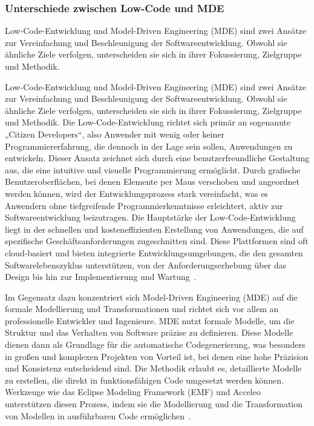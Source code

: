 \subsubsection{Unterschiede zwischen Low-Code und MDE}
Low-Code-Entwicklung und Model-Driven Engineering (MDE) sind zwei Ansätze zur Vereinfachung und Beschleunigung der 
Softwareentwicklung. Obwohl sie ähnliche Ziele verfolgen, unterscheiden sie sich in ihrer Fokussierung, Zielgruppe und Methodik.

Low-Code-Entwicklung und Model-Driven Engineering (MDE) sind zwei Ansätze zur Vereinfachung und Beschleunigung der 
Softwareentwicklung. Obwohl sie ähnliche Ziele verfolgen, unterscheiden sie sich in ihrer Fokussierung, Zielgruppe und 
Methodik. Die Low-Code-Entwicklung richtet sich primär an sogenannte „Citizen Developers“, also Anwender mit wenig 
oder keiner Programmiererfahrung, die dennoch in der Lage sein sollen, Anwendungen zu entwickeln. Dieser Ansatz zeichnet 
sich durch eine benutzerfreundliche Gestaltung aus, die eine intuitive und visuelle Programmierung ermöglicht. Durch 
grafische Benutzeroberflächen, bei denen Elemente per Maus verschoben und angeordnet werden können, wird der 
Entwicklungsprozess stark vereinfacht, was es Anwendern ohne tiefgreifende Programmierkenntnisse erleichtert, aktiv 
zur Softwareentwicklung beizutragen. Die Hauptstärke der Low-Code-Entwicklung 
liegt in der schnellen und kosteneffizienten Erstellung von Anwendungen, die auf spezifische Geschäftsanforderungen 
zugeschnitten sind. Diese Plattformen sind oft cloud-basiert und bieten integrierte Entwicklungsumgebungen, die den 
gesamten Softwarelebenszyklus unterstützen, von der Anforderungserhebung über das Design bis hin zur Implementierung 
und Wartung~\cite{Cabot_2020}.

Im Gegensatz dazu konzentriert sich Model-Driven Engineering (MDE) auf die formale Modellierung und Transformationen und 
richtet sich vor allem an professionelle Entwickler und Ingenieure. MDE nutzt formale Modelle, um die Struktur und das 
Verhalten von Software präzise zu definieren. Diese Modelle dienen dann als Grundlage für die automatische Codegenerierung, 
was besonders in großen und komplexen Projekten von Vorteil ist, bei denen eine hohe Präzision und Konsistenz entscheidend 
sind. Die Methodik erlaubt es, detaillierte Modelle zu erstellen, die direkt in funktionsfähigen Code umgesetzt werden 
können. Werkzeuge wie das Eclipse Modeling Framework (EMF) und Acceleo unterstützen diesen Prozess, indem sie die Modellierung 
und die Transformation von Modellen in ausführbaren Code ermöglichen~\cite{di2022low}.

